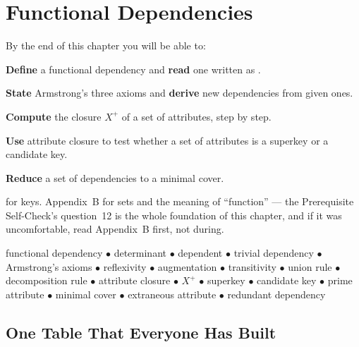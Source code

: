 \chapter{Functional Dependencies}\label{ch:fds}

\begin{outcomes}
By the end of this chapter you will be able to:
\begin{tight}
  \item \textbf{Define} a functional dependency and \textbf{read} one written
        as .
  \item \textbf{State} Armstrong's three axioms and \textbf{derive} new
        dependencies from given ones.
  \item \textbf{Compute} the closure $X^{+}$ of a set of attributes, step by
        step.
  \item \textbf{Use} attribute closure to test whether a set of attributes is
        a superkey or a candidate key.
  \item \textbf{Reduce} a set of dependencies to a minimal cover.
\end{tight}
\end{outcomes}

\begin{prereq}
 for keys. Appendix~B for sets and the meaning of
``function'' --- the Prerequisite Self-Check's question~12 is the whole
foundation of this chapter, and if it was uncomfortable, read Appendix~B
first, not during.
\end{prereq}

\begin{keyterms}
functional dependency $\bullet$ determinant $\bullet$ dependent $\bullet$
trivial dependency $\bullet$ Armstrong's axioms $\bullet$ reflexivity
$\bullet$ augmentation $\bullet$ transitivity $\bullet$ union rule $\bullet$
decomposition rule $\bullet$ attribute closure $\bullet$ $X^{+}$ $\bullet$
superkey $\bullet$ candidate key $\bullet$ prime attribute $\bullet$ minimal
cover $\bullet$ extraneous attribute $\bullet$ redundant dependency
\end{keyterms}

\section{One Table That Everyone Has Built}

